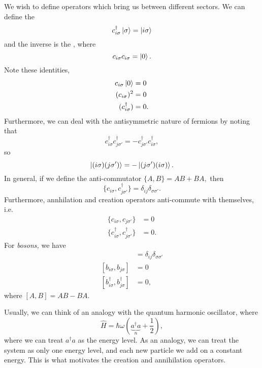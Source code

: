 \documentclass{article}
\numberwithin{equation}{section}
\begin{document}
We wish to define operators which bring us between different sectors. We can define the 
\begin{equation*}
    c^\dagger_{i\sigma}\ket{\sigma} = \ket{i\sigma}
\end{equation*}
and the inverse is the , where
\begin{equation*}
    c_{i\sigma}c_{i\sigma} = \ket{0}.
\end{equation*}
Note these identities, 
\begin{align*}
    c_{i\sigma}\ket{0} &= 0 \\ 
    (c_{i\sigma})^2 &= 0 \\ 
    (c^\dagger_{i\sigma}) &= 0.
\end{align*}
Furthermore, we can deal with the antisymmetric nature of fermions by noting that 
\begin{equation*}
    c^\dagger_{i\sigma}c^\dagger_{j\sigma'} = -c^\dagger_{j\sigma'}c^\dagger_{i\sigma},
\end{equation*}
so
\begin{equation*}
    \ket{(i\sigma)(j\sigma')} = -\ket{(j\sigma')(i\sigma)}.
\end{equation*}
In general, if we define the anti-commutator $\{A,B\}=AB+BA,$ then 
\begin{equation}
    \{c_{i\sigma},c^\dagger_{j\sigma'}\} = \delta_{ij}\delta_{\sigma\sigma'}.
\end{equation}
Furthermore, annhilation and creation operators anti-commute with themselves, i.e. 
\begin{align*}
    \{c_{i\sigma}, c_{j\sigma'}\} &= 0 \\
    \{c^\dagger_{i\sigma}, c^\dagger_{j\sigma'}\} &= 0.
\end{align*}
For \textit{bosons,} we have 
\begin{align*}
    [b_{i\sigma},b_{j\sigma}^\dagger] &= \delta_{ij}\delta_{\sigma\sigma'} \\
    [b_{i\sigma},b_{j\sigma}] &= 0 \\
    [b_{i\sigma}^\dagger,b_{j\sigma}^\dagger] &= 0,
\end{align*}
where $[A,B]=AB-BA.$

Usually, we can think of an analogy with the quantum harmonic oscillator, where 
\begin{equation}
    \hat{H} = \hbar\omega\left(\underbrace{a^\dagger a}_{n} + \frac{1}{2}\right),
\end{equation}
where we can treat $a^\dagger a$ as the energy level. As an analogy, we can treat the system as only one energy level, and each new particle we add on a constant energy. This is what motivates the creation and annihilation operators.
\end{document}
